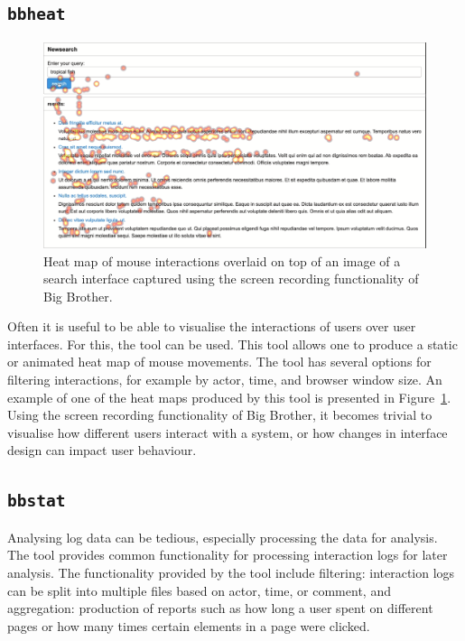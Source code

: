 \vspace{-8pt}
\subsection{\texttt{bbheat}}

\begin{figure}
	\vspace{-8pt}
	\includegraphics[width=\linewidth]{heatmap}
	\vspace{-8pt}
	\caption{Heat map of mouse interactions overlaid on top of an image of a search interface captured using the screen recording functionality of Big Brother.\vspace{-8pt}}
	\label{fig:heat}
\end{figure}

Often it is useful to be able to visualise the interactions of users over user interfaces. For this, the \bbheat tool can be used. This tool allows one to produce a static or animated heat map of mouse movements. The tool has several options for filtering interactions, for example by actor, time, and browser window size. An example of one of the heat maps produced by this tool is presented in Figure~\ref{fig:heat}. Using the screen recording functionality of Big Brother, it becomes trivial to visualise how different users interact with a system, or how changes in interface design can impact user behaviour.

\vspace{-8pt}
\subsection{\texttt{bbstat}}

Analysing log data can be tedious, especially processing the data for analysis. The \bbstat tool provides common functionality for processing interaction logs for later analysis. The functionality provided by the \bbstat tool include filtering: interaction logs can be split into multiple files based on actor, time, or comment, and aggregation: production of reports such as how long a user spent on different pages or how many times certain elements in a page were clicked.

